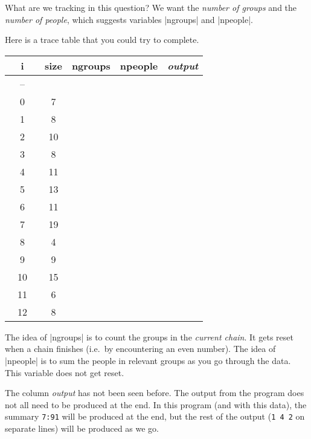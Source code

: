 What are we tracking in this question? We want the \emph{number of groups} and the
\emph{number of people}, which suggests variables \pycode|ngroups| and \pycode|npeople|.

Here is a trace table that you could try to complete.

\bigskip
\begin{center}
  \begin{tabular}{ccccc}
    \toprule
    ~~i~~ & size & ngroups & npeople & \emph{output} \\
    \midrule
    --    &      &         &         &               \\
    0     & 7    &         &         &               \\
    1     & 8    &         &         &               \\
    2     & 10   &         &         &               \\
    3     & 8    &         &         &               \\
    4     & 11   &         &         &               \\
    5     & 13   &         &         &               \\
    6     & 11   &         &         &               \\
    7     & 19   &         &         &               \\
    8     & 4    &         &         &               \\
    9     & 9    &         &         &               \\
    10    & 15   &         &         &               \\
    11    & 6    &         &         &               \\
    12    & 8    &         &         &               \\
    \bottomrule
  \end{tabular}
\end{center}
\bigskip

The idea of \pycode|ngroups| is to count the groups in the \emph{current chain}. It gets
reset when a chain finishes (i.e.~by encountering an even number). The idea of
\pycode|npeople| is to sum the people in relevant groups as you go through the data. This
variable does not get reset.

The column \emph{output} has not been seen before. The output from the program does not
all need to be produced at the end. In this program (and with this data), the summary
\texttt{7:91} will be produced at the end, but the rest of the output (\texttt{1 4 2} on
separate lines) will be produced as we go.

